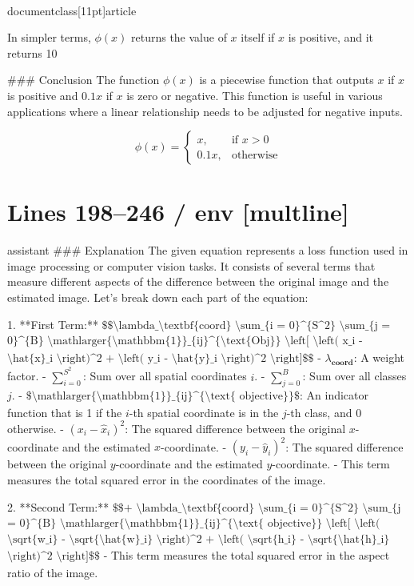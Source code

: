 \\documentclass[11pt]{article}
\begin{document}
In simpler terms, \(\phi(x)\) returns the value of \(x\) itself if \(x\) is positive, and it returns 10%

### Conclusion
The function \(\phi(x)\) is a piecewise function that outputs \(x\) if \(x\) is positive and \(0.1x\) if \(x\) is zero or negative. This function is useful in various applications where a linear relationship needs to be adjusted for negative inputs.

\[
\boxed{\phi(x) =
\begin{cases}
    x, & \text{if } x > 0\\
    0.1x, & \text{otherwise}
    \end{cases}}
\]


\section*{Lines 198–246 / env [multline]}
assistant
### Explanation
The given equation represents a loss function used in image processing or computer vision tasks. It consists of several terms that measure different aspects of the difference between the original image and the estimated image. Let's break down each part of the equation:

1. **First Term:**
   \[
   \lambda_\textbf{coord}
   \sum_{i = 0}^{S^2}
    \sum_{j = 0}^{B}
     \mathlarger{\mathbbm{1}}_{ij}^{\text{Obj}}
            \left[
            \left(
                x_i - \hat{x}_i
            \right)^2 +
            \left(
                y_i - \hat{y}_i
            \right)^2
            \right]
   \]
   - \(\lambda_\textbf{coord}\): A weight factor.
   - \(\sum_{i = 0}^{S^2}\): Sum over all spatial coordinates \(i\).
   - \(\sum_{j = 0}^{B}\): Sum over all classes \(j\).
   - \(\mathlarger{\mathbbm{1}}_{ij}^{\text{ objective}}\): An indicator function that is 1 if the \(i\)-th spatial coordinate is in the \(j\)-th class, and 0 otherwise.
   - \((x_i - \hat{x}_i)^2\): The squared difference between the original \(x\)-coordinate and the estimated \(x\)-coordinate.
   - \((y_i - \hat{y}_i)^2\): The squared difference between the original \(y\)-coordinate and the estimated \(y\)-coordinate.
   - This term measures the total squared error in the coordinates of the image.

2. **Second Term:**
   \[
   + \lambda_\textbf{coord}
   \sum_{i = 0}^{S^2}
    \sum_{j = 0}^{B}
         \mathlarger{\mathbbm{1}}_{ij}^{\text{ objective}}
         \left[
        \left(
            \sqrt{w_i} - \sqrt{\hat{w}_i}
        \right)^2 +
        \left(
            \sqrt{h_i} - \sqrt{\hat{h}_i}
        \right)^2
        \right]
   \]
   - This term measures the total squared error in the aspect ratio of the image.
\end{document}
